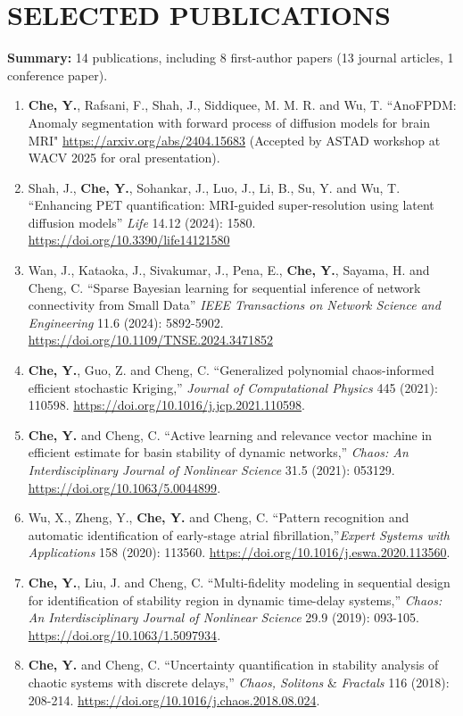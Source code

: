 \documentclass[10pt]{article}
\begin{document}
\section*{SELECTED PUBLICATIONS} 
\vspace{-0.5em}
\hspace{1.2em}\textbf{Summary:} 14 publications, including 8 first-author papers (13 journal articles, 1 conference paper).
\vspace{-0.5em}
\begin{enumerate}
	\setlength\itemsep{0.5pt}
	\item {\bf Che, Y.}, Rafsani, F., Shah, J., Siddiquee, M. M. R. and Wu, T. ``AnoFPDM: Anomaly segmentation with forward process of diffusion models for brain MRI" \url{https://arxiv.org/abs/2404.15683} (Accepted by ASTAD workshop at WACV 2025 for oral presentation).

	\item Shah, J., {\bf Che, Y.}, Sohankar, J., Luo, J., Li, B., Su, Y. and Wu, T. ``Enhancing PET quantification: MRI-guided super-resolution using latent diffusion models'' \textit{Life} 14.12 (2024): 1580. \url{https://doi.org/10.3390/life14121580}
	
	\item Wan, J., Kataoka, J., Sivakumar, J., Pena, E., {\bf Che, Y.}, Sayama, H. and Cheng, C. ``Sparse Bayesian learning for sequential inference of network connectivity from Small Data'' \textit{IEEE Transactions on Network Science and Engineering} 11.6 (2024): 5892-5902. \url{https://doi.org/10.1109/TNSE.2024.3471852}
	
	\item {\bf Che, Y.}, Guo, Z. and Cheng, C. ``Generalized polynomial chaos-informed efficient stochastic Kriging,'' \textit{Journal of Computational Physics} 445 (2021): 110598. \url{https://doi.org/10.1016/j.jcp.2021.110598}.
	
	\item {\bf Che, Y.} and Cheng, C. ``Active learning and relevance vector machine in efficient estimate for basin stability of dynamic networks,'' \textit{Chaos: An Interdisciplinary Journal of Nonlinear Science} 31.5 (2021): 053129. \url{https://doi.org/10.1063/5.0044899}.
	
	\item Wu, X., Zheng, Y., {\bf Che, Y.} and Cheng, C. ``Pattern recognition and automatic identification of early-stage atrial fibrillation,''\textit{Expert Systems with Applications} 158 (2020): 113560. \url{https://doi.org/10.1016/j.eswa.2020.113560}.
	
	\item {\bf Che, Y.}, Liu, J.  and Cheng, C. ``Multi-fidelity modeling in sequential design for identification of stability region in dynamic time-delay systems,''  \textit{Chaos: An Interdisciplinary Journal of Nonlinear Science} 29.9 (2019): 093-105. \url{https://doi.org/10.1063/1.5097934}.

	\item {\bf Che, Y.} and Cheng, C. ``Uncertainty quantification in stability analysis of chaotic systems with discrete delays,'' \textit{Chaos, Solitons} \& \textit{Fractals} 116 (2018): 208-214. \url{https://doi.org/10.1016/j.chaos.2018.08.024}.
\end{enumerate}
\end{document}
